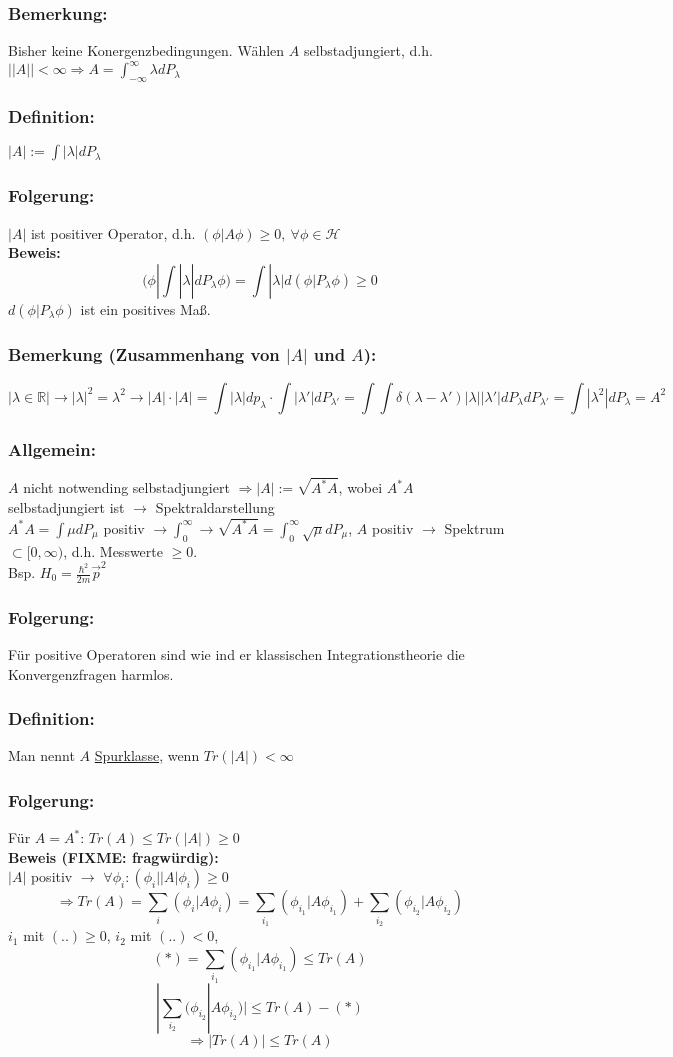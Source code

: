 \documentclass[twoside,a4paper]{scrartcl}
\newcommand{\R}{\mathbb{R}}
\renewcommand{\1}{\mathds{1}}
\newcommand{\Ra}{\Rightarrow}
\newcommand{\ra}{\rightarrow}
\renewcommand{\l}{\lambda}
\renewcommand{\H}{\mathcal{H}}
\renewcommand{\R}{\mathbb{R}}
\begin{document}
\subsubsection*{Bemerkung:}
Bisher keine Konergenzbedingungen. Wählen $A$ selbstadjungiert, d.h. $||A|| < \infty \Ra A=\int_{-\infty}^\infty \l dP_\l$
\subsubsection*{Definition:}
$|A|:= \int |\l|dP_\l$
\subsubsection*{Folgerung:}
$|A|$ ist positiver Operator, d.h. $(\phi|A\phi)\geq 0, \ \forall \phi\in \H$\\
\textbf{Beweis:}
$$(\phi|\int |\l| dP_\l \phi)=\int |\l| d(\phi|P_\l \phi) \geq 0$$
$d(\phi|P_\l \phi)$ ist ein positives Maß.
\subsubsection*{Bemerkung (Zusammenhang von $|A|$ und $A$):}
$$|\l \in \R| \ra |\l|^2=\l^2 \ra |A| \cdot |A|=\int |\l| dp_\l \cdot \int |\l'|dP_{\l'}=\int \int \delta(\l-\l') |\l||\l'|dP_\l dP_{\l'}=\int |\l^2|dP_\l=A^2$$
\subsubsection*{Allgemein:}
$A$ nicht notwending selbstadjungiert $\Ra |A|:= \sqrt{A^*A}$, wobei $A^*A$ selbstadjungiert ist $\ra$ Spektraldarstellung\\
$A^*A=\int \mu dP_\mu$ positiv $\ra \int_0^\infty \ra \sqrt{A^*A}=\int_0^\infty \sqrt{\mu}dP_\mu$, $A$ positiv $\ra$ Spektrum $\subset [0,\infty)$, d.h. Messwerte $\geq 0$.\\
Bsp. $H_0=\frac{\hbar^2}{2m}\vec p^2$
\subsubsection*{Folgerung:}
Für positive Operatoren sind wie ind er klassischen Integrationstheorie die Konvergenzfragen harmlos.
\subsubsection*{Definition:}
Man nennt $A$ \underline{Spurklasse}, wenn $Tr(|A|)< \infty$
\subsubsection*{Folgerung:}
Für $A=A^*$: $Tr(A) \leq Tr(|A|) \geq 0$\\
\textbf{Beweis (FIXME: fragwürdig):}\\
$|A|$ positiv $\ra$ $\forall \phi_i: (\phi_i| |A| \phi_i)\geq 0$\\
$$\Ra Tr(A)=\sum_i (\phi_i|A\phi_i)=\sum_{i_1}(\phi_{i_1}|A\phi_{i_1})+\sum_{i_2}(\phi_{i_2}|A\phi_{i_2})$$
$i_1$ mit $(..)\geq 0$, $i_2$ mit $(..)< 0$, 
$$(*)=\sum_{i_1}(\phi_{i_1}|A\phi_{i_1}) \leq Tr(A)$$
$$|\sum_{i_2}(\phi_{i_2}|A\phi_{i_2})| \leq Tr(A)-(*)$$
$$\Ra |Tr(A)| \leq Tr(A)$$
\end{document}
